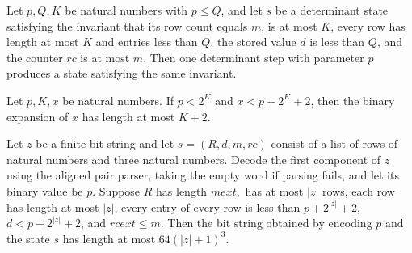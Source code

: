 \begin{theorem}
\label{Complexity.BinArith.lInv_step}
\leanok
{}
Let $p,Q,K$ be natural numbers with $p\le Q$, and let $s$ be a determinant state
satisfying the invariant that its row count equals $m$, is at most $K$, every row has
length at most $K$ and entries less than $Q$, the stored value $d$ is less than $Q$, and
the counter $rc$ is at most $m$. Then one determinant step with parameter $p$ produces a
state satisfying the same invariant.
\end{theorem}

\begin{theorem}
\label{Complexity.BinArith.length_bits_le_of_lt_Q}
\leanok
{}
Let $p,K,x$ be natural numbers. If $p<2^K$ and $x<p+2^K+2$, then the binary expansion of
$x$ has length at most $K+2$.
\end{theorem}

\begin{theorem}
\label{Complexity.BinArith.length_encState_le}
\leanok
{}
Let $z$ be a finite bit string and let $s=(R,d,m,rc)$ consist of a list of rows of
natural numbers and three natural numbers. Decode the first component of $z$ using the
aligned pair parser, taking the empty word if parsing fails, and let its binary value be
$p$. Suppose $R$ has length $m	ext{,}$ has at most $|z|$ rows, each row has length at
most $|z|$, every entry of every row is less than $p+2^{|z|}+2$, $d<p+2^{|z|}+2$, and
$rc	ext{≤}m$. Then the bit string obtained by encoding $p$ and the state $s$ has length
at most $64(|z|+1)^3$.
\end{theorem}

